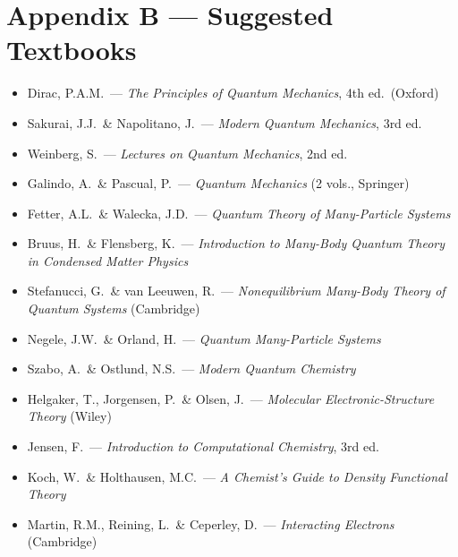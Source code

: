\documentclass[11pt,a4paper]{article}
\begin{document}
\section*{Appendix B --- Suggested Textbooks}

\medskip{}\par\smallskip
\begin{itemize}[leftmargin=1.5em]
  \item Dirac, P.A.M.\ --- \textit{The Principles of Quantum Mechanics}, 4th ed.\ (Oxford)
  \item Sakurai, J.J.\ \& Napolitano, J.\ --- \textit{Modern Quantum Mechanics}, 3rd ed.
  \item Weinberg, S.\ --- \textit{Lectures on Quantum Mechanics}, 2nd ed.
  \item Galindo, A.\ \& Pascual, P.\ --- \textit{Quantum Mechanics} (2 vols., Springer)
\end{itemize}

\medskip{}\par\smallskip
\begin{itemize}[leftmargin=1.5em]
  \item Fetter, A.L.\ \& Walecka, J.D.\ --- \textit{Quantum Theory of Many-Particle Systems}
  \item Bruus, H.\ \& Flensberg, K.\ --- \textit{Introduction to Many-Body Quantum Theory in Condensed Matter Physics}
  \item Stefanucci, G.\ \& van Leeuwen, R.\ --- \textit{Nonequilibrium Many-Body Theory of Quantum Systems} (Cambridge)
  \item Negele, J.W.\ \& Orland, H.\ --- \textit{Quantum Many-Particle Systems}
\end{itemize}

\medskip{}\par\smallskip
\begin{itemize}[leftmargin=1.5em]
  \item Szabo, A.\ \& Ostlund, N.S.\ --- \textit{Modern Quantum Chemistry}
  \item Helgaker, T., Jorgensen, P.\ \& Olsen, J.\ --- \textit{Molecular Electronic-Structure Theory} (Wiley)
  \item Jensen, F.\ --- \textit{Introduction to Computational Chemistry}, 3rd ed.
  \item Koch, W.\ \& Holthausen, M.C.\ --- \textit{A Chemist's Guide to Density Functional Theory}
  \item Martin, R.M., Reining, L.\ \& Ceperley, D.\ --- \textit{Interacting Electrons} (Cambridge)
\end{itemize}

\end{document}
